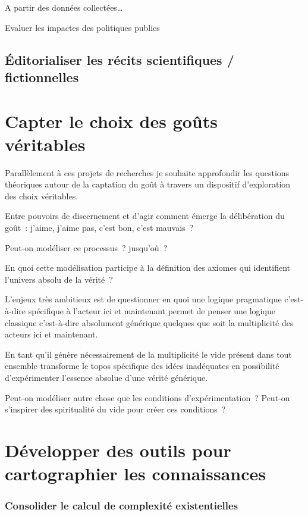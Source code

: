 \documentclass[
  letterpaper,
  DIV=11,
  numbers=noendperiod]{scrreprt}
\begin{document}
A partir des données collectées\ldots{}

Evaluer les impactes des politiques publics

\hypertarget{uxe9ditorialiser-les-ruxe9cits-scientifiques-fictionnelles}{%
\section{Éditorialiser les récits scientifiques /
fictionnelles}\label{uxe9ditorialiser-les-ruxe9cits-scientifiques-fictionnelles}}

\hypertarget{sec-capterGout}{%
\chapter{Capter le choix des goûts véritables}\label{sec-capterGout}}

Parallèlement à ces projets de recherches je souhaite approfondir les
questions théoriques autour de la captation du goût à travers un
dispositif d'exploration des choix véritables.

Entre pouvoirs de discernement et d'agir comment émerge la délibération
du goût~: j'aime, j'aime pas, c'est bon, c'est mauvais~?

Peut-on modéliser ce processus~? jusqu'où~?

En quoi cette modélisation participe à la définition des axiomes qui
identifient l'univers absolu de la vérité~?

L'enjeux très ambitieux est de questionner en quoi une logique
pragmatique c'est-à-dire spécifique à l'acteur ici et maintenant permet
de penser une logique classique c'est-à-dire absolument générique
quelques que soit la multiplicité des acteurs ici et maintenant.

En tant qu'il génère nécessairement de la multiplicité le vide présent
dans tout ensemble transforme le topos spécifique des idées inadéquates
en possibilité d'expérimenter l'essence absolue d'une vérité générique.

Peut-on modéliser autre chose que les conditions d'expérimentation~?
Peut-on s'inspirer des spiritualité du vide pour créer ces conditions~?

\hypertarget{sec-developper}{%
\chapter{Développer des outils pour cartographier les
connaissances}\label{sec-developper}}

\hypertarget{consolider-le-calcul-de-complexituxe9-existentielles}{%
\subsection{Consolider le calcul de complexité
existentielles}\label{consolider-le-calcul-de-complexituxe9-existentielles}}
\end{document}

